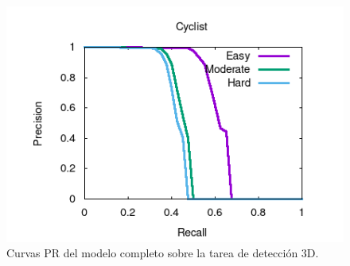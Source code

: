 \begin{figure}[H]
\begin{minipage}{0.333\textwidth}
		\centering
		\includegraphics[width=1\linewidth]{Book/figures/9_completo/cyclist_detection_3d.png}
	\end{minipage}
	\caption{Curvas PR del modelo completo sobre la tarea de detección 3D.}
	\label{fig:Curvas PR del modelo completo sobre la tarea de detección 3D.}
\end{figure}

